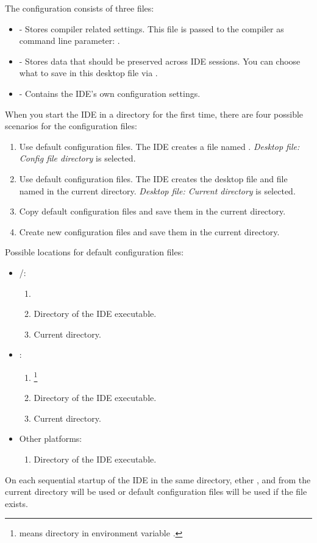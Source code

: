 The configuration consists of three files:
\begin{itemize}
\item {} - Stores compiler related settings. This file is
passed to the compiler as command line parameter: .
\item {} - Stores data that should be preserved across IDE sessions.
You can choose what to save in this desktop file via .
\item {} - Contains the IDE's own configuration settings.
\end{itemize}
When you start the IDE in a directory for the first time, there are four
possible scenarios for the configuration files:
\begin{enumerate}
\item Use default configuration files. The IDE creates a file named .
 \emph{Desktop file: Config file
directory} is selected.
\item Use default configuration files. The IDE creates the desktop file and file
named  in the current directory. 
\emph{Desktop file: Current directory} is selected.
\item Copy default configuration files and save them in the current directory.
\item Create new configuration files and save them in the current directory.
\end{enumerate}
Possible locations for default configuration files:
\begin{itemize}
\item \linux/\unix:
\begin{enumerate}
\item {}
\item Directory of the IDE executable.
\item Current directory.
\end{enumerate}
\item \windows:
\begin{enumerate}
\item {}\footnote{ means directory
in environment variable .}
\item Directory of the IDE executable.
\item Current directory.
\end{enumerate}
\item Other platforms:
\begin{enumerate}
\item Directory of the IDE executable.
\end{enumerate}
\end{itemize}
On each sequential startup of the IDE in the same directory, ether ,
 and  from the current directory will be used or
default configuration files will be used if the  file exists.
%
%
